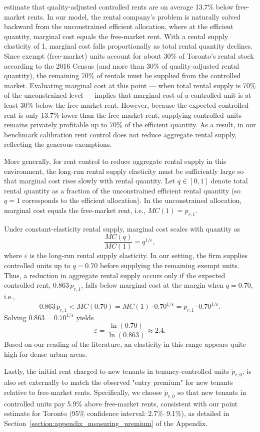 \documentclass[parskip=full]{article}
\begin{document}
\citet{zhang-gou} estimate that quality-adjusted controlled rents are on average 13.7\% below free-market rents. In our model, the rental company’s problem is naturally solved backward from the unconstrained efficient allocation, where at the efficient quantity, marginal cost equals the free-market rent. With a rental supply elasticity of 1, marginal cost falls proportionally as total rental quantity declines. Since exempt (free-market) units account for about 30\% of Toronto’s rental stock according to the 2016 Census (and more than 30\% of quality-adjusted rental quantity), the remaining 70\% of rentals must be supplied from the controlled market. Evaluating marginal cost at this point — when total rental supply is 70\% of the unconstrained level — implies that marginal cost of a controlled unit is at least 30\% below the free-market rent. However, because the expected controlled rent is only 13.7\% lower than the free-market rent, supplying controlled units remains privately profitable up to 70\% of the efficient quantity. As a result, in our benchmark calibration rent control does not reduce aggregate rental supply, reflecting the generous exemptions.

More generally, for rent control to reduce aggregate rental supply in this environment, the long-run rental supply elasticity must be sufficiently large so that marginal cost rises slowly with rental quantity. Let $q \in [0,1]$ denote total rental quantity as a fraction of the unconstrained efficient rental quantity (so $q=1$ corresponds to the efficient allocation). In the unconstrained allocation, marginal cost equals the free-market rent, i.e., $MC(1)=p_{r,1}$. 

Under constant-elasticity rental supply, marginal cost scales with quantity as
\[
\frac{MC(q)}{MC(1)} = q^{1/\varepsilon},
\]
where $\varepsilon$ is the long-run rental supply elasticity. In our setting, the firm supplies controlled units up to $q=0.70$ before supplying the remaining exempt units. Thus, a reduction in aggregate rental supply occurs only if the expected controlled rent, $0.863\,p_{r,1}$, falls below marginal cost at the margin when $q=0.70$, i.e.,
\[
0.863\,p_{r,1} < MC(0.70) = MC(1)\cdot 0.70^{1/\varepsilon} = p_{r,1}\cdot 0.70^{1/\varepsilon}.
\]
Solving $0.863 = 0.70^{1/\varepsilon}$ yields
\[
\varepsilon = \frac{\ln(0.70)}{\ln(0.863)} \approx 2.4.
\]
Based on our reading of the literature, an elasticity in this range appears quite high for dense urban areas.

Lastly, the initial rent charged to new tenants in tenancy-controlled units $\tilde{p}_{r,0}$, is also set externally to match the observed "entry premium" for new tenants relative to free-market rents. Specifically, we choose $\tilde{p}_{r,0}$ so that new tenants in controlled units pay 5.9\% above free-market rents, consistent with our point estimate for Toronto (95\% confidence interval: 2.7\%–9.1\%), as detailed in Section~\ref{section:appendix_measuring_premium} of the Appendix.
\end{document}
